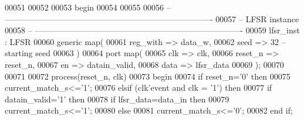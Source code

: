 \begin{DoxyCode}
00051 
00052   
00053 \textcolor{vhdlkeyword}{begin}
00054 
00055 
00056 \textcolor{keyword}{-- ----------------------------------------------------------------------------}
00057 \textcolor{keyword}{-- LFSR instance}
00058 \textcolor{keyword}{-- ----------------------------------------------------------------------------}
00059 lfsr_inst : LFSR
00060     \textcolor{keywordflow}{generic} \textcolor{keywordflow}{map}(
00061             reg_with    => data_w,
00062             seed        => \textcolor{vhdllogic}{32} \textcolor{keyword}{--starting seed}
00063 \textcolor{vhdlchar}{)}
00064     \textcolor{keywordflow}{port} \textcolor{keywordflow}{map}(
00065       clk           => clk, 
00066       reset_n       => reset_n, 
00067         en              => datain_valid, 
00068         data            => lfsr_data     
00069         \textcolor{vhdlchar}{)};
00070 
00071 
00072   \textcolor{keywordflow}{process}(reset_n, clk)
00073 \textcolor{vhdlkeyword}{    begin}
00074       \textcolor{keywordflow}{if} \textcolor{vhdlchar}{reset_n}\textcolor{vhdlchar}{=}\textcolor{vhdlchar}{'}\textcolor{vhdllogic}{}\textcolor{vhdllogic}{0}\textcolor{vhdlchar}{'} \textcolor{keywordflow}{then}
00075         \textcolor{vhdlchar}{current_match_s}\textcolor{vhdlchar}{<=}\textcolor{vhdlchar}{'}\textcolor{vhdllogic}{}\textcolor{vhdllogic}{1}\textcolor{vhdlchar}{'}; 
00076       \textcolor{keywordflow}{elsif} \textcolor{vhdlchar}{(}\textcolor{vhdlchar}{clk}\textcolor{vhdlchar}{'}\textcolor{vhdlkeyword}{event} \textcolor{keywordflow}{and} \textcolor{vhdlchar}{clk} \textcolor{vhdlchar}{=} \textcolor{vhdlchar}{'}\textcolor{vhdllogic}{}\textcolor{vhdllogic}{1}\textcolor{vhdlchar}{'}\textcolor{vhdlchar}{)} \textcolor{keywordflow}{then}
00077           \textcolor{keywordflow}{if} \textcolor{vhdlchar}{datain_valid}\textcolor{vhdlchar}{=}\textcolor{vhdlchar}{'}\textcolor{vhdllogic}{}\textcolor{vhdllogic}{1}\textcolor{vhdlchar}{'} \textcolor{keywordflow}{then}
00078                 \textcolor{keywordflow}{if}  \textcolor{vhdlchar}{lfsr_data}\textcolor{vhdlchar}{=}\textcolor{vhdlchar}{data_in} \textcolor{keywordflow}{then}
00079                     \textcolor{vhdlchar}{current_match_s}\textcolor{vhdlchar}{<=}\textcolor{vhdlchar}{'}\textcolor{vhdllogic}{}\textcolor{vhdllogic}{1}\textcolor{vhdlchar}{'};
00080                 \textcolor{keywordflow}{else} 
00081                     \textcolor{vhdlchar}{current_match_s}\textcolor{vhdlchar}{<=}\textcolor{vhdlchar}{'}\textcolor{vhdllogic}{}\textcolor{vhdllogic}{0}\textcolor{vhdlchar}{'};
00082                 \textcolor{keywordflow}{end} \textcolor{keywordflow}{if};

\end{DoxyCode}

